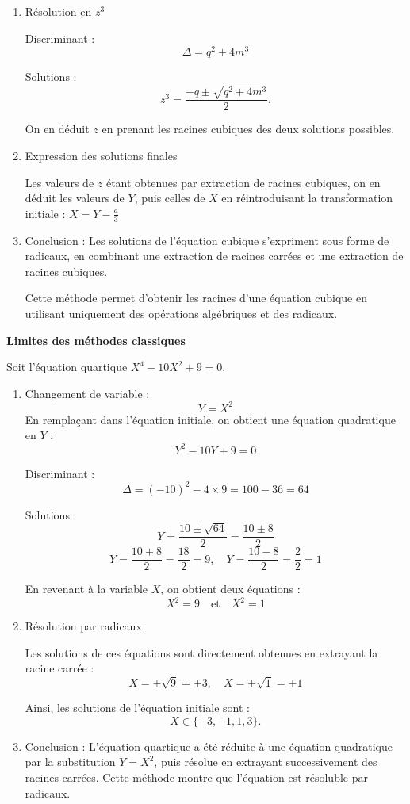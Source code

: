 \documentclass[10pt,a4paper]{article}
\begin{document}
\begin{enumerate}
    \item Résolution en \( z^3 \)

    Discriminant :
    \[
    \Delta = q^2 + 4m^3
    \]

    Solutions :
    \[
    z^3 = \frac{-q \pm \sqrt{q^2 + 4m^3}}{2}.
    \]

    On en déduit \( z \) en prenant les racines cubiques des deux solutions possibles.

    \item Expression des solutions finales

    Les valeurs de \( z \) étant obtenues par extraction de racines cubiques, on en déduit les valeurs
    de \( Y \), puis celles de \( X \) en réintroduisant la transformation initiale :
    \(
    X = Y - \frac{a}{3}
    \)

    \item Conclusion : Les solutions de l'équation cubique s'expriment sous forme de radicaux, en
    combinant une extraction de racines carrées et une extraction de racines cubiques.

    Cette méthode permet d'obtenir les racines d'une équation cubique en utilisant uniquement des
    opérations algébriques et des radicaux.
\end{enumerate}

\bigskip
\textbf{Limites des méthodes classiques}

\q Soit l'équation quartique \( X^4 - 10X^2 + 9 = 0 \).

\begin{enumerate}
    \item Changement de variable :
    \[
    Y = X^2
    \]
    En remplaçant dans l'équation initiale, on obtient une équation quadratique en \( Y \) :
    \[
    Y^2 - 10Y + 9 = 0
    \]

    Discriminant :
    \[
    \Delta = (-10)^2 - 4 \times 9 = 100 - 36 = 64
    \]

    Solutions :
    \[
    Y = \frac{10 \pm \sqrt{64}}{2} = \frac{10 \pm 8}{2}
    \]
    \[
    Y = \frac{10 + 8}{2} = \frac{18}{2} = 9, \quad Y = \frac{10 - 8}{2} = \frac{2}{2} = 1
    \]

    En revenant à la variable \( X \), on obtient deux équations :
    \[
    X^2 = 9 \quad \text{et} \quad X^2 = 1
    \]

    \item Résolution par radicaux

    Les solutions de ces équations sont directement obtenues en extrayant la racine carrée :
    \[
    X = \pm \sqrt{9} = \pm 3, \quad X = \pm \sqrt{1} = \pm 1
    \]

    Ainsi, les solutions de l'équation initiale sont :
    \[
    X \in \{-3, -1, 1, 3\}.
    \]

    \item Conclusion : L'équation quartique a été réduite à une équation quadratique par la substitution \( Y = X^2 \),
    puis résolue en extrayant successivement des racines carrées. Cette méthode montre que l'équation
    est résoluble par radicaux.
\end{enumerate}
\end{document}

